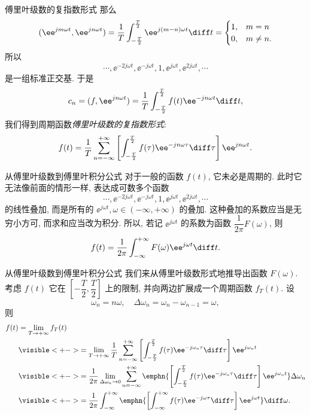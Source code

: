 \begin{frame}{傅里叶级数的复指数形式}
	\onslide<+->
	那么
	\[(\ee^{jm\omega t},\ee^{jn\omega t})
	=\frac1T\int_{-\frac T2}^{\frac T2} \ee^{j(m-n)\omega t}\diff t=\begin{cases}
		1,&m=n\\
		0,&m\neq n.
	\end{cases}
	\]
	\onslide<+->
	所以
	\[\cdots,\ee^{-2j\omega t},\ee^{-j\omega t},1,\ee^{j\omega t},\ee^{2j\omega t},\cdots
	\]
	是一组标准正交基.
	\onslide<+->
	于是
	\[
		c_n=(f,\ee^{jn\omega t})=\frac 1T\int_{-\frac T2}^{\frac T2}f(t)\ee^{-jn\omega t} \diff t,
	
	\]
	\onslide<+->
	我们得到周期函数\emph{傅里叶级数的复指数形式}:
	\[
		f(t)=\frac 1T\sum_{n=-\infty}^{+\infty}\left[\int_{-\frac T2}^{\frac T2}f(\tau)\ee^{-jn\omega\tau} \diff\tau\right] \ee^{jn\omega t}.
	
	\]
\end{frame}


\begin{frame}{从傅里叶级数到傅里叶积分公式}
	\onslide<+->
	对于一般的函数 $f(t)$, 它未必是周期的.
	\onslide<+->
	此时它无法像前面的情形一样, 表达成可数多个函数
	\[\cdots,\ee^{-2j\omega t},\ee^{-j\omega t},1,\ee^{j\omega t},\ee^{2j\omega t},\cdots
	\]
	的线性叠加,
	\onslide<+->
	而是所有的 $\ee^{j\omega t},\omega\in(-\infty,+\infty)$ 的叠加.
	\onslide<+->
	这种叠加的系数应当是无穷小方可, 而求和应当改为积分.
	\onslide<+->
	所以, 若记 $\ee^{j\omega t}$ 的系数为函数 $\dfrac1{2\pi}F(\omega)$, 则
	\[f(t)=\frac1{2\pi}\int_{-\infty}^{+\infty} F(\omega) \ee^{j\omega t}\diff t.
	\]
\end{frame}


\begin{frame}{从傅里叶级数到傅里叶积分公式}
	\onslide<+->
	我们来从傅里叶级数形式地推导出函数 $F(\omega)$.
	\onslide<+->
	考虑 $f(t)$ 它在 $\left[-\dfrac T2,\dfrac T2\right]$ 上的限制, 并向两边扩展成一个周期函数 $f_T(t)$.
	\onslide<+->
	设
	\[\omega_n=n\omega,\quad \Delta\omega_n=\omega_n-\omega_{n-1}=\omega,
	\]
	则
	\begin{align*}
		f(t)&=\lim_{T\to +\infty}f_T(t)\\
		&\visible<+->{=\lim_{T\to+\infty} \frac 1T \sum_{n=-\infty}^{+\infty} \left[\int_{-\frac T2}^{\frac T2}f(\tau)\ee^{-j\omega_n\tau}\diff\tau\right] \ee^{j\omega_n t}}\\
		&\visible<+->{=\frac1{2\pi}\lim_{\Delta\omega_n\to 0}\sum_{n=-\infty}^{+\infty}\emphn{\left[\int_{-\frac T2}^{\frac T2}f(\tau)\ee^{-j\omega_n\tau} \diff \tau\right] \ee^{j\omega_n t}}\Delta\omega_n}\\
		&\visible<+->{=\frac1{2\pi}\int_{-\infty}^{+\infty}\emphn{\left[\int_{-\infty}^{+\infty}f(\tau) \ee^{-j\omega\tau} \diff \tau\right]\ee^{j\omega t}}\diff\omega.}
	\end{align*}
\end{frame}



